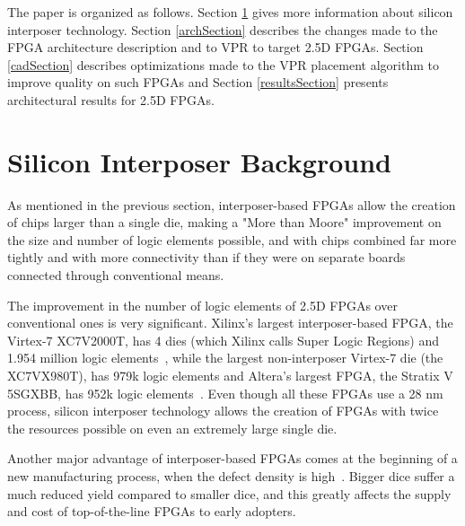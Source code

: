 \documentclass{sig-alternate-2013}
\begin{document}
The paper is organized as follows. Section \ref{siliconSection} gives more information about silicon interposer technology. Section \ref{archSection} describes the changes made to the FPGA architecture description and to VPR to target 2.5D FPGAs. Section \ref{cadSection} describes optimizations made to the VPR placement algorithm to improve quality on such FPGAs and Section \ref{resultsSection} presents architectural results for 2.5D FPGAs.


\section{Silicon Interposer Background}
\label{siliconSection}

As mentioned in the previous section, interposer-based FPGAs allow the creation of chips larger than a single die, making a "More than Moore" improvement on the size and number of logic elements possible, and with chips combined far more tightly and with more connectivity than if they were on separate boards connected through conventional means.

The improvement in the number of logic elements of 2.5D FPGAs over conventional ones is very significant. Xilinx's largest interposer-based FPGA, the Virtex-7 XC7V2000T, has 4 dies (which Xilinx calls Super Logic Regions) and 1.954 million logic elements~\cite{xilinx7series}, while the largest non-interposer Virtex-7 die (the XC7VX980T), has 979k logic elements and Altera's largest FPGA, the Stratix V 5SGXBB, has 952k logic elements~\cite{stratixV}. Even though all these FPGAs use a 28 nm process, silicon interposer technology allows the creation of FPGAs with twice the resources possible on even an extremely large single die.

Another major advantage of interposer-based FPGAs comes at the beginning of a new manufacturing process, when the defect density is high~\cite{xilinxTSVperformance}. Bigger dice suffer a much reduced yield compared to smaller dice, and this greatly affects the supply and cost of top-of-the-line FPGAs to early adopters.
\end{document}
